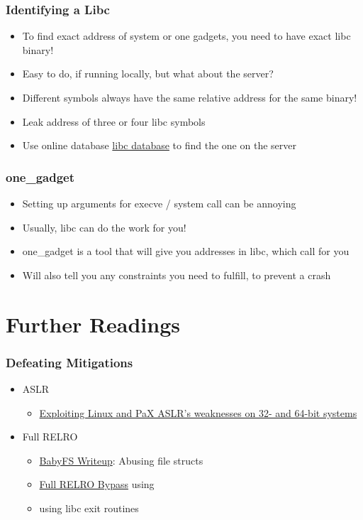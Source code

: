 \documentclass[aspectratio=169]{beamer}
\begin{document}
\begin{frame}
    \frametitle{Identifying a Libc}
    \begin{itemize}
        \item To find exact address of system or one gadgets, you need to have exact libc binary!
        \item Easy to do, if running locally, but what about the server?
        \pause
        \item Different symbols always have the same relative address for the same binary!
        \item Leak address of three or four libc symbols
        \item Use online database \href{https://libc.blukat.me}{libc database} to find the one on the server
    \end{itemize}
\end{frame}

\begin{frame}[fragile]
    \frametitle{one\_gadget}
    \begin{itemize}
        \item Setting up arguments for execve / system call can be annoying
        \item Usually, libc can do the work for you!
        \item one\_gadget is a tool that will give you addresses in libc, which call  for you
        \item Will also tell you any constraints you need to fulfill, to prevent a crash
    \end{itemize}

\end{frame}

\section{Further Readings}
\begin{frame}[fragile]
    \frametitle{Defeating Mitigations}
    \begin{itemize}
        \item ASLR
        \begin{itemize}
            \item \href{https://www.blackhat.com/docs/asia-16/materials/asia-16-Marco-Gisbert-Exploiting-Linux-And-PaX-ASLRS-Weaknesses-On-32-And-64-Bit-Systems-wp.pdf}{Exploiting Linux and PaX ASLR’s weaknesses on 32- and 64-bit systems}
        \end{itemize}
        \item Full RELRO
        \begin{itemize}
            \item \href{https://atum.li/2017/11/08/babyfs/}{BabyFS Writeup}: Abusing file structs 
            \item \href{https://made0x78.com/bseries-fullrelro/}{Full RELRO Bypass} using 
            \item \href{}{} using libc exit routines
        \end{itemize}
    \end{itemize}
\end{frame}
\end{document}
